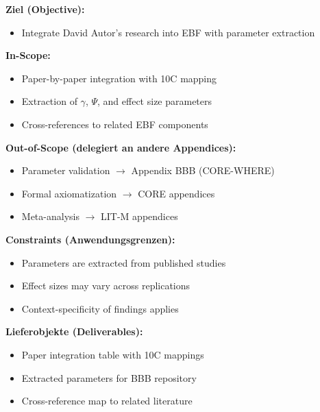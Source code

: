 
\begin{tcolorbox}[
    colback=orange!5!white,
    colframe=orange!75!black,
    title={\textbf{Appendix Scope: Ziel / In-Scope / Out-of-Scope / Constraints}},
    fonttitle=\bfseries
]

\textbf{Ziel (Objective):}
\begin{itemize}[nosep]
    \item Integrate David Autor's research into EBF with parameter extraction
\end{itemize}

\textbf{In-Scope:}
\begin{itemize}[nosep]
    \item Paper-by-paper integration with 10C mapping
    \item Extraction of $\gamma$, $\Psi$, and effect size parameters
    \item Cross-references to related EBF components
\end{itemize}

\textbf{Out-of-Scope (delegiert an andere Appendices):}
\begin{itemize}[nosep]
    \item Parameter validation $\rightarrow$ Appendix BBB (CORE-WHERE)
    \item Formal axiomatization $\rightarrow$ CORE appendices
    \item Meta-analysis $\rightarrow$ LIT-M appendices
\end{itemize}

\textbf{Constraints (Anwendungsgrenzen):}
\begin{itemize}[nosep]
    \item Parameters are extracted from published studies
    \item Effect sizes may vary across replications
    \item Context-specificity of findings applies
\end{itemize}

\textbf{Lieferobjekte (Deliverables):}
\begin{itemize}[nosep]
    \item Paper integration table with 10C mappings
    \item Extracted parameters for BBB repository
    \item Cross-reference map to related literature
\end{itemize}

\end{tcolorbox}

